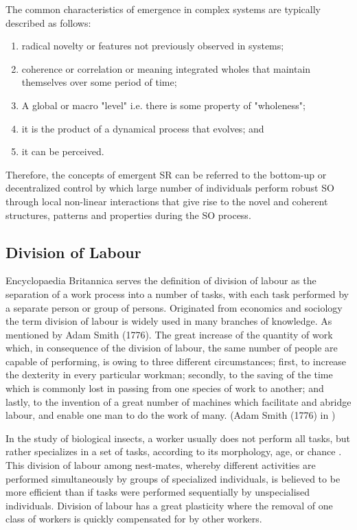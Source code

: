 The common characteristics of emergence in complex systems \cite{Corning2002} are typically described as follows: 
\begin{enumerate}
\item radical novelty or features not previously observed in systems; 
\item coherence or correlation or meaning integrated wholes that maintain themselves over some period of time; 
\item  A global or macro "level" i.e. there is some property of "wholeness"; 
\item it is the product of a dynamical process that evolves; and 
\item it can be perceived.  
\end{enumerate}

Therefore, the concepts of emergent SR can be referred to the bottom-up or decentralized control by which large number of individuals perform robust SO through local non-linear interactions that give rise to the novel and coherent structures, patterns and properties during the SO process. 

\subsection{Division of Labour}
Encyclopaedia Britannica serves the definition of division of labour as the separation of a work process into a number of tasks, with each task performed by a separate person or group of persons. Originated from economics and sociology the term division of labour is widely used in many branches of knowledge. As mentioned by Adam Smith (1776).
The great increase of the quantity of work which, in consequence of the division of labour, the same number of people are capable of performing, is owing to three different circumstances; first, to increase the dexterity in every particular workman; secondly, to the saving of the time which is commonly lost in passing from one species of work to another; and lastly, to the invention of a great number of machines which facilitate and abridge labour, and   enable one man to do the work of many. (Adam Smith (1776) in \cite{Sendova-Franks+1999})

In the study of biological insects, a worker usually does not perform all tasks, but rather specializes in a set of tasks, according to its morphology, age, or chance \cite{Bonabeau+1999}. This division of labour among nest-mates, whereby different activities are performed simultaneously by groups of specialized individuals, is believed to be more efficient than if tasks were performed sequentially by unspecialised individuals. Division of  labour has a great plasticity where the removal of one class of workers is quickly compensated for by other workers.

